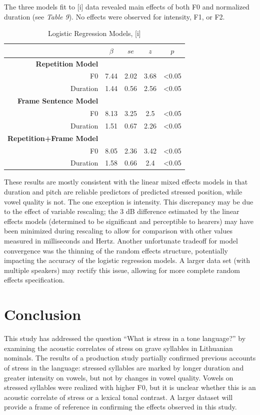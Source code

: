 \documentclass[english,man]{apa6}
\theoremstyle{definition}
\theoremstyle{definition}
\theoremstyle{definition}
\theoremstyle{remark}
\begin{document}
The three models fit to {[}i{]} data revealed main effects of both F0
and normalized duration (see \textit{Table 9}). No effects were observed
for intensity, F1, or F2.

\begin{table}
\begin{center}
\caption{Logistic Regression Models, [i]}
\begin{tabular}{r|cccc}
& $\beta$ & $se$ & $z$ & $p$ \\
\hline \
\textbf{Repetition Model} \\
F0 & 7.44 & 2.02 & 3.68 & <0.05 \\
Duration & 1.44 & 0.56 & 2.56 & <0.05 \\
\hline
\textbf{Frame Sentence Model} \\
F0 & 8.13 & 3.25 & 2.5 & <0.05 \\
Duration & 1.51 & 0.67 & 2.26 & <0.05 \\
\hline
\textbf{Repetition+Frame Model} \\
F0 & 8.05 & 2.36 & 3.42 & <0.05 \\
Duration & 1.58 & 0.66 & 2.4 & <0.05 \\
\end{tabular}
\end{center}
\end{table}

These results are mostly consistent with the linear mixed effects models
in that duration and pitch are reliable predictors of predicted stressed
position, while vowel quality is not. The one exception is intensity.
This discrepancy may be due to the effect of variable rescaling; the 3
dB difference estimated by the linear effects models (determined to be
significant and perceptible to hearers) may have been minimized during
rescaling to allow for comparison with other values measured in
milliseconds and Hertz. Another unfortunate tradeoff for model
convergence was the thinning of the random effects structure,
potentially impacting the accuracy of the logistic regression models. A
larger data set (with multiple speakers) may rectify this issue,
allowing for more complete random effects specification.

\section{Conclusion}\label{conclusion}

This study has addressed the question \enquote{What is stress in a tone
language?} by examining the acoustic correlates of stress on grave
syllables in Lithuanian nominals. The results of a production study
partially confirmed previous accounts of stress in the language:
stressed syllables are marked by longer duration and greater intensity
on vowels, but not by changes in vowel quality. Vowels on stressed
syllables were realized with higher F0, but it is unclear whether this
is an acoustic correlate of stress or a lexical tonal contrast. A larger
dataset will provide a frame of reference in confirming the effects
observed in this study.
\end{document}
